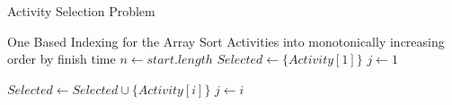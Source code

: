 \documentclass[12pt]{article}
\begin{document}
\begin{algorithm}

  \caption{Activity Selection Problem}
  \begin{algorithmic}[1]
    \Ensure One Based Indexing for the Array
    \Statex
        \State Sort Activities into monotonically increasing order by finish time
        \State $n \gets start.length$
        \State $Selected \gets \{Activity[1]\}$  
        \State $j \gets 1$ 

                \State $Selected \gets Selected  \cup \{Activity[i]\} $
                \State $j \gets i$
            \EndIf
        \EndFor
        
        \State {}
    \EndFunction
  \end{algorithmic}
  
\end{algorithm}
\end{document}

